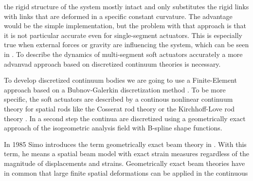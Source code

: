 the rigid structure of the system mostly intact and only substitutes the rigid links with links that are deformed in a specific constant curvature. 
The advantage would be the simple implementation, but the problem with that approach is that it is not particular accurate even for single-segment actuators. This is especially true when external forces or gravity
are influencing the system, which can be seen in \cite{Neppalli2007_conf}. To describe the dynamics of multi-segment soft actuators accurately a more advanvad approach based on 
discretized continuum theories is necessary.
%
\par
To develop discretized continuum bodies we are going to use a Finite-Element approach based on a Bubnov-Galerkin discretization method \cite{Harsch2021a}.
To be more specific, the soft actuators are described by a continous nonlinear continuum theory for spatial rods like the Cosserat rod theory \cite{Rubin2013_book}
 or the Kirchhoff-Love rod theory \cite{Meier2016_diss}. In a second step the continua are discretized using a geometrically exact approach of the isogeometric analysis field
with B-spline shape functions.
%
\par
In 1985 Simo introduces the term geometrically exact beam theory in \cite{Simo1985, Simo1986}. With this term, he means a spatial beam model with exact strain measures regardless
 of the magnitude of displacements and strains. Geometrically exact beam theories have in common that large finite spatial deformations can be applied in the continuous

